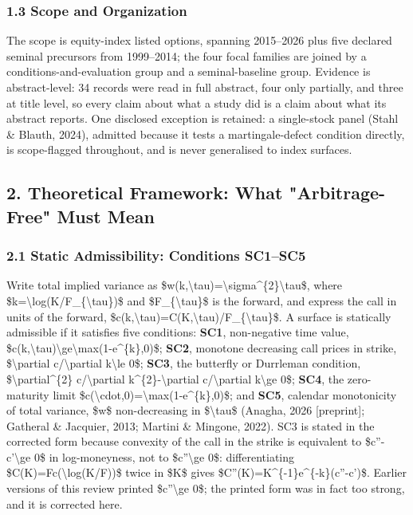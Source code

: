\documentclass[11pt]{article}
\begin{document}
\subsubsection*{1.3 Scope and Organization}
The scope is equity-index listed options, spanning 2015–2026 plus five declared seminal precursors from 1999–2014; the four focal families are joined by a conditions-and-evaluation group and a seminal-baseline group. Evidence is abstract-level: 34 records were read in full abstract, four only partially, and three at title level, so every claim about what a study did is a claim about what its abstract reports. One disclosed exception is retained: a single-stock panel (Stahl \& Blauth, 2024), admitted because it tests a martingale-defect condition directly, is scope-flagged throughout, and is never generalised to index surfaces.

\subsection*{2. Theoretical Framework: What "Arbitrage-Free" Must Mean}
\subsubsection*{2.1 Static Admissibility: Conditions SC1–SC5}
Write total implied variance as \$w(k,\textbackslash{}tau)=\textbackslash{}sigma\textasciicircum{}\{2\}\textbackslash{}tau\$, where \$k=\textbackslash{}log(K/F\_\{\textbackslash{}tau\})\$ and \$F\_\{\textbackslash{}tau\}\$ is the forward, and express the call in units of the forward, \$c(k,\textbackslash{}tau)=C(K,\textbackslash{}tau)/F\_\{\textbackslash{}tau\}\$. A surface is statically admissible if it satisfies five conditions: \textbf{SC1}, non-negative time value, \$c(k,\textbackslash{}tau)\textbackslash{}ge\textbackslash{}max(1-e\textasciicircum{}\{k\},0)\$; \textbf{SC2}, monotone decreasing call prices in strike, \$\textbackslash{}partial c/\textbackslash{}partial k\textbackslash{}le 0\$; \textbf{SC3}, the butterfly or Durrleman condition, \$\textbackslash{}partial\textasciicircum{}\{2\} c/\textbackslash{}partial k\textasciicircum{}\{2\}-\textbackslash{}partial c/\textbackslash{}partial k\textbackslash{}ge 0\$; \textbf{SC4}, the zero-maturity limit \$c(\textbackslash{}cdot,0)=\textbackslash{}max(1-e\textasciicircum{}\{k\},0)\$; and \textbf{SC5}, calendar monotonicity of total variance, \$w\$ non-decreasing in \$\textbackslash{}tau\$ (Anagha, 2026 [preprint]; Gatheral \& Jacquier, 2013; Martini \& Mingone, 2022). SC3 is stated in the corrected form because convexity of the call in the strike is equivalent to \$c''-c'\textbackslash{}ge 0\$ in log-moneyness, not to \$c''\textbackslash{}ge 0\$: differentiating \$C(K)=Fc(\textbackslash{}log(K/F))\$ twice in \$K\$ gives \$C''(K)=K\textasciicircum{}\{-1\}e\textasciicircum{}\{-k\}(c''-c')\$. Earlier versions of this review printed \$c''\textbackslash{}ge 0\$; the printed form was in fact too strong, and it is corrected here.
\end{document}
